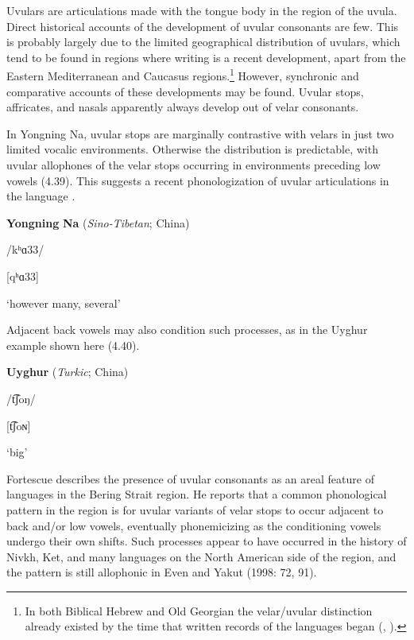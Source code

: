   Uvulars are articulations made with the tongue body in the region of the uvula. Direct historical accounts of the development of uvular consonants are few. This is probably largely due to the limited geographical distribution of uvulars, which tend to be found in regions where writing is a recent development, apart from the Eastern Mediterranean and Caucasus regions.\footnote{ \textrm{In both Biblical Hebrew and Old Georgian the velar/uvular distinction already existed by the time that written records of the languages began (\citealt{Rendsburg1997}, \citealt{Butskhrikidze2002}).}}  However, synchronic and comparative accounts of these developments may be found. Uvular stops, affricates, and nasals apparently always develop out of velar consonants.

  In Yongning Na, uvular stops are marginally contrastive with velars in just two limited vocalic environments. Otherwise the distribution is predictable, with uvular allophones of the velar stops occurring in environments preceding low vowels (4.39). This suggests a recent phonologization of uvular articulations in the language \citep[28]{Lidz2010}.

\ea\label{ex:(4.39)}
  \textbf{Yongning} \textbf{Na} (\textit{Sino-Tibetan}; China)

/kʰɑ33/

[qʰɑ33]

‘however many, several’

\citep[80]{Lidz2010}

\z

Adjacent back vowels may also condition such processes, as in the Uyghur example shown here (4.40).

\ea\label{ex:(4.40)}
  \textbf{Uyghur} (\textit{Turkic}; China)

/t͡ʃoŋ/

[t͡ʃoɴ]

‘big’

\citep[76]{Hahn1991}

\z

  Fortescue describes the presence of uvular consonants as an areal feature of languages in the Bering Strait region. He reports that a common phonological pattern in the region is for uvular variants of velar stops to occur adjacent to back and/or low vowels, eventually phonemicizing as the conditioning vowels undergo their own shifts. Such processes appear to have occurred in the history of Nivkh, Ket, and many languages on the North American side of the region, and the pattern is still allophonic in Even and Yakut (1998: 72, 91).

